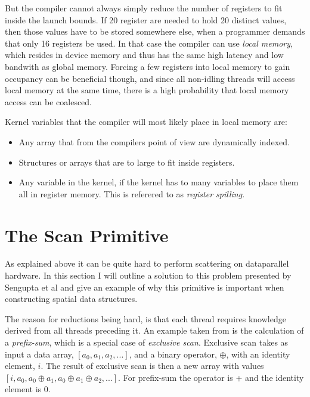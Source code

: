 



But the compiler cannot always simply reduce the number of registers
to fit inside the launch bounds. If 20 register are needed to hold 20
distinct values, then those values have to be stored somewhere else,
when a programmer demands that only 16 registers be used. In that case
the compiler can use \textit{local memory}, which resides in device
memory and thus has the same high latency and low bandwith as global
memory. Forcing a few registers into local memory to gain occupancy
can be beneficial though, and since all non-idling threads will access
local memory at the same time, there is a high probability that local
memory access can be coalesced.

Kernel variables that the compiler will most likely place in local
memory are:

\begin{itemize}
  \item Any array that from the compilers point of view are
    dynamically indexed.
  \item Structures or arrays that are to large to fit inside registers.
  \item Any variable in the kernel, if the kernel has to many
    variables to place them all in register memory. This is referered
    to as \textit{register spilling}.
\end{itemize}



\section{The Scan Primitive}\label{sec:GPUprims}


As explained above it can be quite hard to perform scattering on
dataparallel hardware. In this section I will outline a solution to
this problem presented by Sengupta et al and
give an example of why this primitive is important when constructing
spatial data structures.


The reason for reductions being hard, is that each thread requires
knowledge derived from all threads preceding it. An example taken from
 is the calculation of a \textit{prefix-sum},
which is a special case of \textit{exclusive scan}. Exclusive scan
takes as input a data array, $[a_0, a_1, a_2, ...]$, and a binary
operator, $\oplus$, with an identity element, $i$. The result of
exclusive scan is then a new array with values $[i, a_0, a_0 \oplus
  a_1, a_0 \oplus a_1 \oplus a_2, ...]$. For prefix-sum the operator
is + and the identity element is 0.

